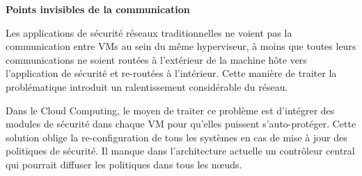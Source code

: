 





\textbf{Points invisibles de la communication}

Les applications de sécurité réseaux traditionnelles ne voient pas la communication entre VMs au sein du même hyperviseur, à moins que toutes leurs communications ne soient routées à l'extérieur de la machine hôte vers l'application de sécurité et re-routées à l'intérieur. Cette manière de traiter la problématique introduit un ralentissement considérable du réseau. 

Dans le Cloud Computing, le moyen de traiter ce problème est d'intégrer des modules de sécurité dans chaque VM pour qu'elles puissent s'auto-protéger. Cette solution oblige la re-configuration de tous les systèmes en cas de mise à jour des politiques de sécurité. Il manque dans l'architecture actuelle un contrôleur central qui pourrait diffuser les politiques dans tous les nœuds. 

